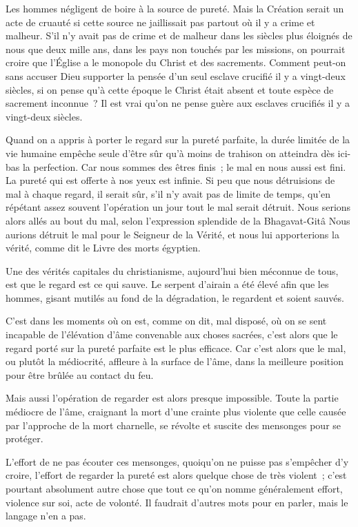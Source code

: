 \documentclass[french,twoside]{book} %
\begin{document}
Les hommes négligent de boire à la source de pureté. Mais la Création serait un acte de cruauté si cette source ne jaillissait pas partout où il y a crime et malheur. S'il n'y avait pas de crime et de malheur dans les siècles plus éloignés de nous que deux mille ans, dans les pays non touchés par les missions, on pourrait croire que l'Église a le monopole du Christ et des sacrements. Comment peut-on sans accuser Dieu supporter la pensée d'un seul esclave crucifié il y a vingt-deux siècles, si on pense qu'à cette époque le Christ était absent et toute espèce de sacrement inconnue ? Il est vrai qu'on ne pense guère aux esclaves crucifiés il y a vingt-deux siècles.\par
Quand on a appris à porter le regard sur la pureté parfaite, la durée limitée de la vie humaine empêche seule d'être sûr qu'à moins de trahison on atteindra dès ici-bas la perfection. Car nous sommes des êtres finis ; le mal en nous aussi est fini. La pureté qui est offerte à nos yeux est infinie. Si peu que nous détruisions de mal à chaque regard, il serait sûr, s'il n'y avait pas de limite de temps, qu'en répétant assez souvent l'opération un jour tout le mal serait détruit. Nous serions alors allés au bout du mal, selon l'expression splendide de la Bhagavat-Gitâ Nous aurions détruit le mal pour le Seigneur de la Vérité, et nous lui apporterions la vérité, comme dit le Livre des morts égyptien.\par
Une des vérités capitales du christianisme, aujourd'hui bien méconnue de tous, est que le regard est ce qui sauve. Le serpent d'airain a été élevé afin que les hommes, gisant mutilés au fond de la dégradation, le regardent et soient sauvés.\par
C'est dans les moments où on est, comme on dit, mal disposé, où on se sent incapable de l'élévation d'âme convenable aux choses sacrées, c'est alors que le regard porté sur la pureté parfaite est le plus efficace. Car c'est alors que le mal, ou plutôt la médiocrité, affleure à la surface de l'âme, dans la meilleure position pour être brûlée au contact du feu.\par
Mais aussi l'opération de regarder est alors presque impossible. Toute la partie médiocre de l'âme, craignant la mort d'une crainte plus violente que celle causée par l'approche de la mort charnelle, se révolte et suscite des mensonges pour se protéger.\par
L'effort de ne pas écouter ces mensonges, quoiqu'on ne puisse pas s'empêcher d'y croire, l'effort de regarder la pureté est alors quelque chose de très violent ; c'est pourtant absolument autre chose que tout ce qu'on nomme généralement effort, violence sur soi, acte de volonté. Il faudrait d'autres mots pour en parler, mais le langage n'en a pas.\par
\end{document}
